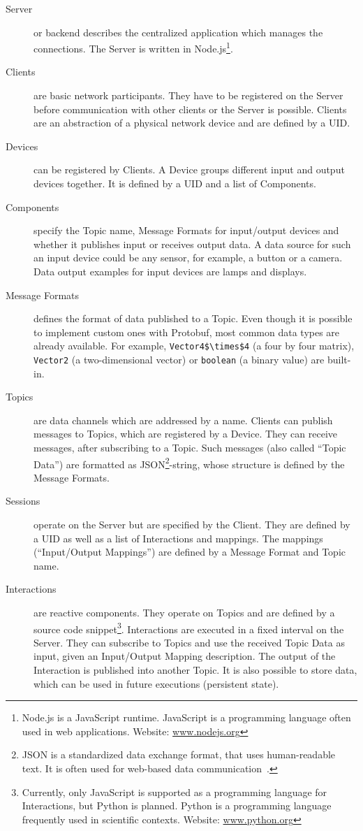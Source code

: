 \begin{description}
	\item[Server] or backend describes the centralized application which manages the connections. The Server is written in Node.js\footnote{Node.js is a JavaScript runtime. JavaScript is a programming language often used in web applications. Website: \href{https://nodejs.org/}{www.nodejs.org}}.
	\item[Clients] are basic network participants. They have to be registered on the Server before communication with other clients or the Server is possible. Clients are an abstraction of a physical network device and are defined by a \ac{UID}.
	\item[Devices] can be registered by Clients. A Device groups different input and output devices together. It is defined by a \ac{UID} and a list of Components.
	\item[Components] specify the Topic name, Message Formats for input/output devices and whether it publishes input or receives output data. A data source for such an input device could be any sensor, for example, a button or a camera. Data output examples for input devices are lamps and displays.
	\item[Message Formats] defines the format of data published to a Topic. Even though it is possible to implement custom ones with \ac{Protobuf}, most common data types are already available. For example, \lstinline[mathescape=true]{Vector4$\times$4} (a four by four matrix), \lstinline{Vector2} (a two-dimensional vector) or \lstinline{boolean} (a binary value) are built-in. %
	\item[Topics] are data channels which are addressed by a name. Clients can publish messages to Topics, which are registered by a Device. They can receive messages, after subscribing to a Topic. Such messages (also called \enquote{Topic Data}) are formatted as JSON\footnote{JSON is a standardized data exchange format, that uses human-readable text. It is often used for web-based data communication~\cite[iii]{ECMAInternational.2017}.}-string, whose structure is defined by the Message Formats.
	\item[Sessions] operate on the Server but are specified by the Client. They are defined by a \ac{UID} as well as a list of Interactions and mappings. The mappings (\enquote{Input/Output Mappings}) are defined by a Message Format and Topic name.
	\item[Interactions] are reactive components. They operate on Topics and are defined by a source code snippet\footnote{Currently, only JavaScript is supported as a programming language for Interactions, but Python is planned. Python is a programming language frequently used in scientific contexts. Website: \href{https://www.python.org/}{www.python.org}}. Interactions are executed in a fixed interval on the Server. They can subscribe to Topics and use the received Topic Data as input, given an Input/Output Mapping description. The output of the Interaction is published into another Topic. It is also possible to store data, which can be used in future executions (persistent state).

\end{description}
